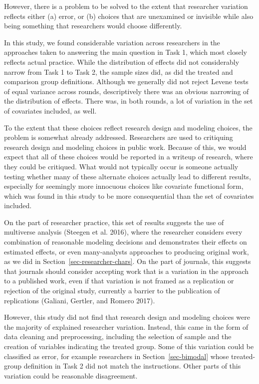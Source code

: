 \documentclass[
  letterpaper,
  DIV=11,
  numbers=noendperiod]{scrartcl}
\begin{document}
However, there is a problem to be solved to the extent that researcher
variation reflects either (a) error, or (b) choices that are unexamined
or invisible while also being something that researchers would choose
differently.

In this study, we found considerable variation across researchers in the
approaches taken to answering the main question in Task 1, which most
closely reflects actual practice. While the distribution of effects did
not considerably narrow from Task 1 to Task 2, the sample sizes did, as
did the treated and comparison group definitions. Although we generally
did not reject Levene tests of equal variance across rounds,
descriptively there was an obvious narrowing of the distribution of
effects. There was, in both rounds, a lot of variation in the set of
covariates included, as well.

To the extent that these choices reflect research design and modeling
choices, the problem is somewhat already addressed. Researchers are used
to critiquing research design and modeling choices in public work.
Because of this, we would expect that all of these choices would be
reported in a writeup of research, where they could be critiqued. What
would not typically occur is someone actually testing whether many of
these alternate choices actually lead to different results, especially
for seemingly more innocuous choices like covariate functional form,
which was found in this study to be more consequential than the set of
covariates included.

On the part of researcher practice, this set of results suggests the use
of multiverse analysis (Steegen et al. 2016), where the researcher
considers every combination of reasonable modeling decisions and
demonstrates their effects on estimated effects, or even many-analysts
approaches to producing original work, as we did in
Section~\ref{sec-researcher-chars}. On the part of journals, this
suggests that journals should consider accepting work that is a
variation in the approach to a published work, even if that variation is
not framed as a replication or rejection of the original study,
currently a barrier to the publication of replications (Galiani,
Gertler, and Romero 2017).

However, this study did not find that research design and modeling
choices were the majority of explained researcher variation. Instead,
this came in the form of data cleaning and preprocessing, including the
selection of sample and the creation of variables indicating the treated
group. Some of this variation could be classified as error, for example
researchers in Section~\ref{sec-bimodal} whose treated-group definition
in Task 2 did not match the instructions. Other parts of this variation
could be reasonable disagreement.
\end{document}

